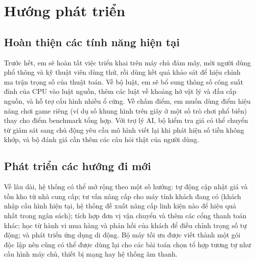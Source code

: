 \section{Hướng phát triển}

\subsection{Hoàn thiện các tính năng hiện tại}

Trước hết, em sẽ hoàn tất việc triển khai trên máy chủ đám mây, mời người dùng phổ thông và kỹ thuật viên dùng thử, rồi dùng kết quả khảo sát để hiệu chỉnh ma trận trọng số của thuật toán. Về bộ luật, em sẽ bổ sung thông số công suất đỉnh của CPU vào luật nguồn, thêm các luật về khoảng hở vật lý và đầu cấp nguồn, và hỗ trợ cấu hình nhiều ổ cứng. Về chấm điểm, em muốn dùng điểm hiệu năng chơi game riêng (ví dụ số khung hình trên giây ở một số trò chơi phổ biến) thay cho điểm benchmark tổng hợp. Với trợ lý AI, bộ kiểm tra giá có thể chuyển từ giám sát sang chủ động yêu cầu mô hình viết lại khi phát hiện số tiền không khớp, và bộ đánh giá cần thêm các câu hỏi thật của người dùng.

\subsection{Phát triển các hướng đi mới}

Về lâu dài, hệ thống có thể mở rộng theo một số hướng: tự động cập nhật giá và tồn kho từ nhà cung cấp; tư vấn nâng cấp cho máy tính khách đang có (khách nhập cấu hình hiện tại, hệ thống đề xuất nâng cấp linh kiện nào để hiệu quả nhất trong ngân sách); tích hợp đơn vị vận chuyển và thêm các cổng thanh toán khác; học từ hành vi mua hàng và phản hồi của khách để điều chỉnh trọng số tự động; và phát triển ứng dụng di động. Bộ máy tối ưu được viết thành một gói độc lập nên cũng có thể được dùng lại cho các bài toán chọn tổ hợp tương tự như cấu hình máy chủ, thiết bị mạng hay hệ thống âm thanh.
